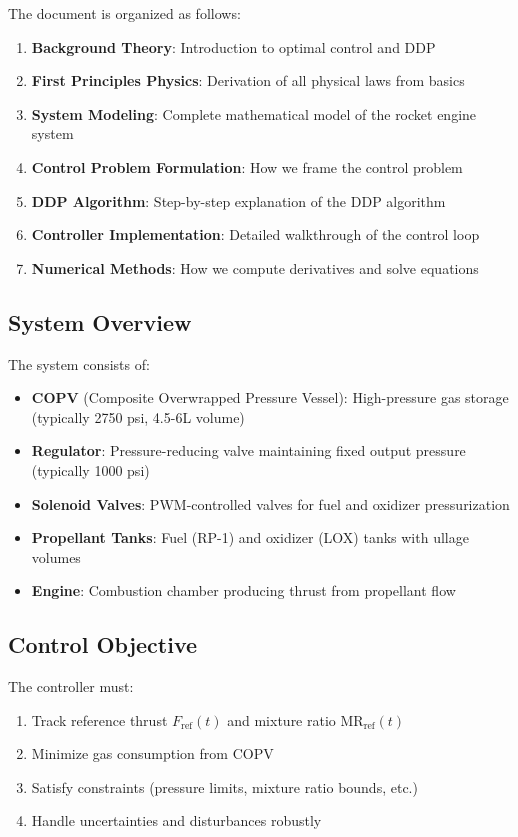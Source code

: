 \documentclass[11pt,a4paper]{article}
\begin{document}
The document is organized as follows:
\begin{enumerate}
    \item \textbf{Background Theory}: Introduction to optimal control and DDP
    \item \textbf{First Principles Physics}: Derivation of all physical laws from basics
    \item \textbf{System Modeling}: Complete mathematical model of the rocket engine system
    \item \textbf{Control Problem Formulation}: How we frame the control problem
    \item \textbf{DDP Algorithm}: Step-by-step explanation of the DDP algorithm
    \item \textbf{Controller Implementation}: Detailed walkthrough of the control loop
    \item \textbf{Numerical Methods}: How we compute derivatives and solve equations
\end{enumerate}

\subsection{System Overview}

The system consists of:
\begin{itemize}
    \item \textbf{COPV} (Composite Overwrapped Pressure Vessel): High-pressure gas storage (typically 2750 psi, 4.5-6L volume)
    \item \textbf{Regulator}: Pressure-reducing valve maintaining fixed output pressure (typically 1000 psi)
    \item \textbf{Solenoid Valves}: PWM-controlled valves for fuel and oxidizer pressurization
    \item \textbf{Propellant Tanks}: Fuel (RP-1) and oxidizer (LOX) tanks with ullage volumes
    \item \textbf{Engine}: Combustion chamber producing thrust from propellant flow
\end{itemize}

\subsection{Control Objective}

The controller must:
\begin{enumerate}
    \item Track reference thrust $F_{\text{ref}}(t)$ and mixture ratio $\text{MR}_{\text{ref}}(t)$
    \item Minimize gas consumption from COPV
    \item Satisfy constraints (pressure limits, mixture ratio bounds, etc.)
    \item Handle uncertainties and disturbances robustly
\end{enumerate}
\end{document}
